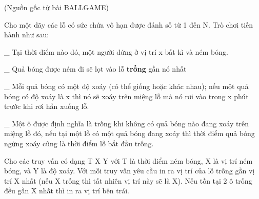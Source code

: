 (Nguồn gốc từ bài BALLGAME)  

   Cho một dãy các lỗ có sức chứa vô hạn được đánh số từ 1 đến N. Trò chơi tiến hành như sau:  

   \_ Tại thời điểm nào đó, một người đứng ở vị trí x bất kì và ném bóng.  

   \_ Quả bóng được ném đi sẽ lọt vào lỗ   \textbf{    trống   }   gần nó nhất  

   \_ Mỗi quả bóng có một độ xoáy (có thể giống hoặc khác nhau); nếu một quả bóng có độ xoáy là x thì nó sẽ xoáy trên miệng lỗ mà nó rơi vào trong x phút trước khi rơi hẳn xuống lỗ.  

   \_ Một ô được định nghĩa là trống khi không có quả bóng nào đang xoáy trên miệng lỗ đó, nếu tại một lỗ có một quả bóng đang xoáy thì thời điểm quả bóng ngừng xoáy cũng là thời điểm lỗ bắt đầu trống.  

   Cho các truy vấn có dạng T X Y với T là thời điểm ném bóng, X là vị trí ném bóng, và Y là độ xoáy. Với mỗi truy vấn yêu cầu in ra vị trí của lỗ trống gần vị trí X nhất (nếu X trống thì tất nhiên vị trí này sẽ là X). Nếu tồn tại 2 ô trống đều gần X nhất thì in ra vị trí bên trái.  

\